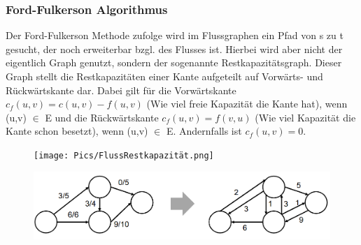 \documentclass[
../../AuD-Zusammenfassung.tex,
]
{subfiles}
\begin{document}
\subsubsection{Ford-Fulkerson Algorithmus}
Der Ford-Fulkerson Methode zufolge wird im Flussgraphen ein Pfad von s zu t gesucht, der noch erweiterbar bzgl. des Flusses ist. Hierbei wird aber nicht der eigentlich Graph genutzt, sondern der sogenannte Restkapazitätsgraph. Dieser Graph stellt die Restkapazitäten einer Kante aufgeteilt auf Vorwärts- und Rückwärtskante dar. Dabei gilt für die Vorwärtskante $c_f(u,v) = c(u,v) - f(u,v)$ (Wie viel freie Kapazität die Kante hat), wenn (u,v) $\in$ E und die Rückwärtskante $c_f(u,v) = f(v,u)$ (Wie viel Kapazität die Kante schon besetzt), wenn (u,v) $\in$ E. Andernfalls ist $c_f(u,v) = 0$. \\
\begin{figure}[htp]
    \centering
    \texttt{[image: Pics/FlussRestkapazität.png]}
\end{figure}
\begin{figure}[htp]
    \centering
    \includegraphics[scale=0.70]{Pics/FlussRKG.png}
\end{figure}
\end{document}

